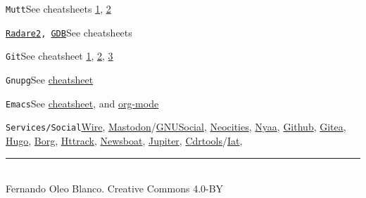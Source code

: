 \documentclass[12pt,landscape]{article}
\def\cm#1#2{{\tt#1}\dotfill#2\par}
\begin{document}
\begin{multicols}{3}
\cm{Mutt}{See cheatsheets \href{https://github.com/JoshuaEstes/CheatSheets/blob/master/mutt.md}{1}, \href{https://www.ucolick.org/~lharden/muttchart.html}{2}}

\cm{\href{https://github.com/zxgio/r2-cheatsheet/blob/master/r2-cheatsheet.pdf}{Radare2}, \href{https://github.com/zxgio/gdb-cheatsheet/blob/master/gdb-cheatsheet.pdf}{GDB}}{See cheatsheets}

\cm{Git}{See cheatsheet \href{http://www.cheat-sheets.org/saved-copy/git-cheat-sheet.pdf}{1}, \href{https://wikileaks.org/ciav7p1/cms/files/atlassian_git_cheatsheet.pdf}{2}, \href{http://ebixio.com/blog/wp-content/uploads/2011/09/git-qrc.pdf}{3}}

\cm{Gnupg}{See \href{http://stuff.imeos.org/persistent/gpg-cheatsheet.pdf}{cheatsheet}}

\cm{Emacs}{See \href{https://www.gnu.org/software/emacs/refcards/pdf/refcard.pdf}{cheatsheet}, and \href{https://orgmode.org/orgcard.pdf}{org-mode}}

\cm{Services/Social}{\href{https://github.com/wireapp}{Wire}, \href{https://github.com/tootsuite/mastodon}{Mastodon}/\href{https://gnu.io/}{GNUSocial}, \href{https://neocities.org/}{Neocities}, \href{https://nyaa.pantsu.cat/}{Nyaa}, \href{https://github.com/}{Github}, \href{https://gitea.io/en-US/}{Gitea}, \href{https://gohugo.io/}{Hugo}, \href{https://www.borgbackup.org/}{Borg}, \href{http://www.httrack.com/}{Httrack}, \href{https://newsboat.org/}{Newsboat}, \href{https://jupyter.org/}{Jupiter}, \href{http://cdrtools.sourceforge.net/private/cdrecord.html}{Cdrtools}/\href{http://iat.berlios.de/}{Iat},}

\vfill
\hrule
~\\
Fernando Oleo Blanco. Creative Commons 4.0-BY
\end{multicols}
\end{document}
